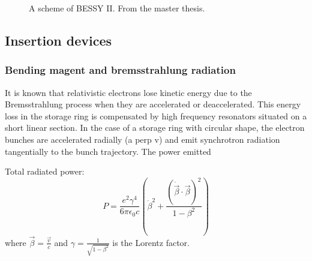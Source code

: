 \begin{figure}%
	\centering
		\caption{A scheme of BESSY II. From the master thesis.}
		\label{fig:BessyScheme}
\end{figure}

\subsection{Insertion devices}

\subsubsection{Bending magent and bremsstrahlung radiation}
It is known that relativistic electrons lose kinetic energy due to the Bremsstrahlung process\citep{blumenthal_bremsstrahlung_1970} when they are accelerated or deaccelerated. This energy loss in the storage ring is compensated by high frequency resonators situated on a short linear section. In the case of a storage ring with circular shape, the electron bunches are accelerated radially (a perp v) and emit synchrotron radiation tangentially to the bunch trajectory. The power emitted


Total radiated power:
\begin{equation}
        P=\frac{e^2\gamma^4}{6\pi\epsilon_0c}\left( \dot{\beta}^2 + \frac{(\dot{\vec{\beta}} \cdot \vec{\beta})^2}{1-\beta^2} \right)
\end{equation}
where $\vec{\beta}=\frac{\vec{v}}{c}$ and $\gamma=\frac{1}{\sqrt{1-\beta^2}}$ is the Lorentz factor.

